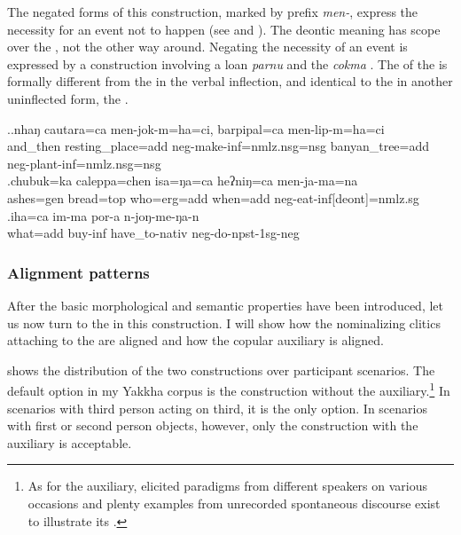 The negated forms of this construction, marked by prefix \emph{men-}, express the necessity for an event not to happen (see \Next[a] and \Next[b]). The deontic meaning has scope over the , not the other  way around. Negating  the  necessity of an event is expressed by a construction involving a  loan \emph{parnu}  and the  \emph{cokma}  \Next[c].  The  of the  is formally different from the  in the verbal inflection, and identical to the  in another uninflected form, the .

\ex.\ag.nhaŋ     cautara=ca  men-jok-m=ha=ci,  barpipal=ca  men-lip-m=ha=ci\\
and\_then resting\_place{\sc =add} {\sc neg-}make{\sc -inf=nmlz.nsg=nsg} banyan\_tree{\sc =add} {\sc neg-}plant{\sc -inf=nmlz.nsg=nsg} \\
\bg.chubuk=ka    caleppa=chen   isa=ŋa=ca          heʔniŋ=ca        men-ja-ma=na\\
ashes{\sc =gen} bread{\sc =top} who{\sc =erg=add} when{\sc =add} {\sc neg-}eat{\sc -inf[deont]=nmlz.sg}\\
 
\bg.iha=ca  im-ma     por-a           n-joŋ-me-ŋa-n\\
what{\sc =add} buy{\sc -inf} have\_to{\sc -nativ} {\sc neg-}do{\sc -npst-1sg-neg}\\
  



\subsubsection{Alignment patterns}

After the basic morphological and semantic properties have been introduced, let us now turn to the  in this construction. I will show how the nominalizing clitics attaching to the  are aligned and how the copular auxiliary is aligned. 

 shows the distribution of the two constructions over participant scenarios. The default option in my Yakkha corpus  is the construction without the auxiliary.\footnote{As for the auxiliary, elicited paradigms from different speakers on various occasions and plenty examples from unrecorded spontaneous discourse exist to illustrate its .} In scenarios with third person acting on third, it is the only option. In scenarios with first or second person objects, however, only the construction with the auxiliary is acceptable.

